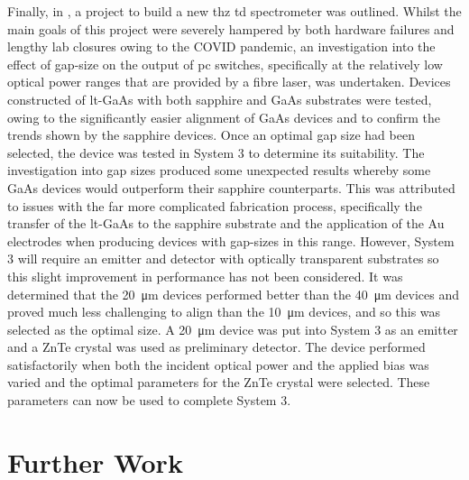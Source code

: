Finally, in , a project to build a new \acrshort{thz} \acrshort{td} spectrometer was outlined. Whilst the main goals of this project were severely hampered by both hardware failures and lengthy lab closures owing to the COVID pandemic, an investigation into the effect of gap\nobreakdash-size on the output of \acrshort{pc} switches, specifically at the relatively low optical power ranges that are provided by a fibre laser, was undertaken. Devices constructed of \acrshort{lt}\nobreakdash-GaAs with both sapphire and GaAs substrates were tested, owing to the significantly easier alignment of GaAs devices and to confirm the trends shown by the sapphire devices. Once an optimal gap size had been selected, the device was tested in System 3 to determine its suitability. The investigation into gap sizes produced some unexpected results whereby some GaAs devices would outperform their sapphire counterparts. This was attributed to issues with the far more complicated fabrication process, specifically the transfer of the \acrshort{lt}\nobreakdash-GaAs to the sapphire substrate and the application of the Au electrodes when producing devices with gap\nobreakdash-sizes in this range. However, System 3 will require an emitter and detector with optically transparent substrates so this slight improvement in performance has not been considered. It was determined that the \SI{20}{\micro\metre} devices performed better than the \SI{40}{\micro\metre} devices and proved much less challenging to align than the \SI{10}{\micro\metre} devices, and so this was selected as the optimal size. A \SI{20}{\micro\metre} device was put into System 3 as an emitter and a ZnTe crystal was used as preliminary detector. The device performed satisfactorily when both the incident optical power and the applied bias was varied and the optimal parameters for the ZnTe crystal were selected. These parameters can now be used to complete System 3. 

\section{Further Work}

